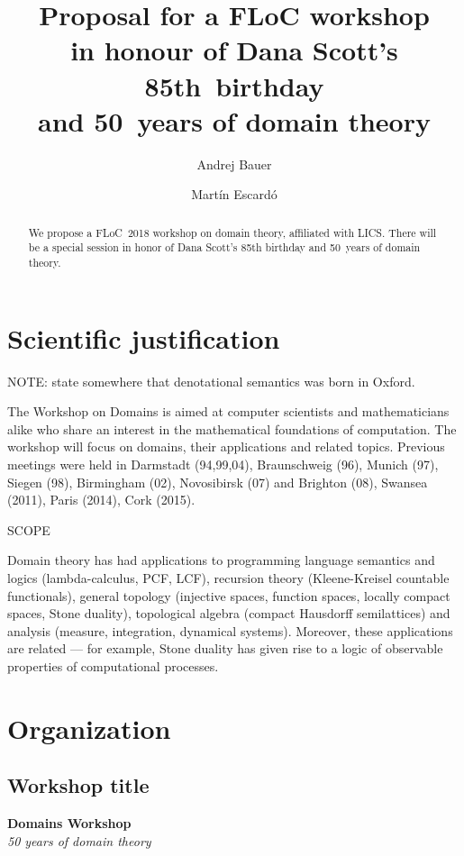 \documentclass{article}
\title{Proposal for a FLoC workshop\\
  in honour of  Dana Scott's 85th~birthday\\
  and 50~years of domain theory}
\author{Andrej Bauer \and Martín Escardó}
\date{}
\begin{document}
\maketitle

\begin{abstract}
  We propose a FLoC~2018 workshop on domain theory, affiliated with LICS. There will be a
  special session in honor of Dana Scott's 85th birthday and 50~years of domain theory.
\end{abstract}

\section{Scientific justification}

NOTE: state somewhere that denotational semantics was born in Oxford.

The Workshop on Domains is aimed at computer scientists and
mathematicians alike who share an interest in the mathematical
foundations of computation. The workshop will focus on domains,
their applications and related topics.  Previous meetings were
held in Darmstadt (94,99,04), Braunschweig (96), Munich (97),
Siegen (98), Birmingham (02), Novosibirsk (07) and Brighton (08),
Swansea (2011), Paris (2014), Cork (2015).

SCOPE

    Domain theory has had applications to programming language
semantics and logics (lambda-calculus, PCF, LCF), recursion theory
(Kleene-Kreisel countable functionals), general topology (injective
spaces, function spaces, locally compact spaces, Stone duality),
topological algebra (compact Hausdorff semilattices) and analysis
(measure, integration, dynamical systems). Moreover, these
applications are related --- for example, Stone duality has given
rise to a logic of observable properties of computational
processes.

\section{Organization}

\subsection{Workshop title}

\begin{center}
\large
\textbf{Domains Workshop}\\
\emph{50 years of domain theory}
\end{center}
\end{document}
